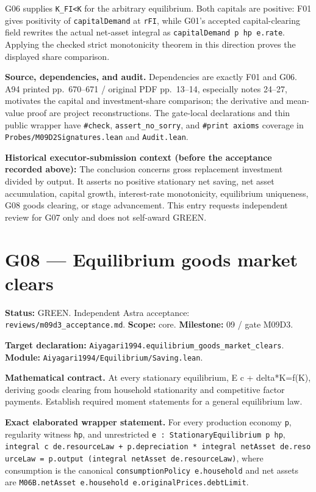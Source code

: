 \documentclass[
  11pt,
]{article}
\let\LedgerOriginalTexttt\texttt
\renewcommand{\texttt}[1]{{\small\LedgerOriginalTexttt{#1}}}
\begin{document}
G06 supplies \texttt{K\_FI\textless{}K} for the arbitrary equilibrium.
Both capitals are positive: F01 gives positivity of
\texttt{capitalDemand} at \texttt{rFI}, while G01's accepted
capital-clearing field rewrites the actual net-asset integral as
\texttt{capitalDemand\ p\ hp\ e.rate}. Applying the checked strict
monotonicity theorem in this direction proves the displayed share
comparison.

\textbf{Source, dependencies, and audit.} Dependencies are exactly F01
and G06. A94 printed pp.~670--671 / original PDF pp.~13--14, especially
notes 24--27, motivates the capital and investment-share comparison; the
derivative and mean-value proof are project reconstructions. The
gate-local declarations and thin public wrapper have \texttt{\#check},
\texttt{assert\_no\_sorry}, and \texttt{\#print\ axioms} coverage in
\texttt{Probes/M09D2Signatures.lean} and \texttt{Audit.lean}.

\textbf{Historical executor-submission context (before the acceptance
recorded above):} The conclusion concerns gross replacement investment
divided by output. It asserts no positive stationary net saving, net
asset accumulation, capital growth, interest-rate monotonicity,
equilibrium uniqueness, G08 goods clearing, or stage advancement. This
entry requests independent review for G07 only and does not self-award
GREEN.

\section{G08 --- Equilibrium goods market
clears}\label{g08-equilibrium-goods-market-clears}

\textbf{Status:} GREEN. Independent Astra acceptance:
\texttt{reviews/m09d3\_acceptance.md}. \textbf{Scope:} core.
\textbf{Milestone:} 09 / gate M09D3.

\textbf{Target declaration:}
\texttt{Aiyagari1994.equilibrium\_goods\_market\_clears}.\\
\textbf{Module:} \texttt{Aiyagari1994/Equilibrium/Saving.lean}.

\textbf{Mathematical contract.} At every stationary equilibrium, E c +
delta*K=f(K), deriving goods clearing from household stationarity and
competitive factor payments. Establish required moment statements for a
general equilibrium law.

\textbf{Exact elaborated wrapper statement.} For every production
economy \texttt{p}, regularity witness \texttt{hp}, and unrestricted
\texttt{e\ :\ StationaryEquilibrium\ p\ hp},
\texttt{integral\ c\ de.resourceLaw\ +\ p.depreciation\ *\ integral\ netAsset\ de.resourceLaw\ =\ p.output\ (integral\ netAsset\ de.resourceLaw)},
where consumption is the canonical
\texttt{consumptionPolicy\ e.household} and net assets are
\texttt{M06B.netAsset\ e.household\ e.originalPrices.debtLimit}.
\end{document}
